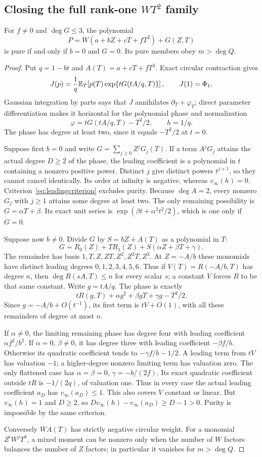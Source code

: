\subsection{Closing the full rank-one $WT^2$ family}\label{sec:rankoneformal}

\begin{proposition}\label{prop:rankoneformal}
For $f\ne0$ and $\deg G\leq3$, the polynomial
\[
 P=W(a+bZ+cT+fT^2)+G(Z,T)
\]
is pure if and only if $b=0$ and $G=0$. Its pure members obey
$m>\deg Q$.
\end{proposition}
\begin{proof}
Put $q=1-bt$ and $A(T)=a+cT+fT^2$. Exact circular contraction
gives
\[
 J(p)=\frac1q\mathbb E_T\!\left[p(T)
             \exp\{tG(tA/q,T)\}\right],\qquad J(1)=\Phi_1.
\]
Gaussian integration by parts says that $J$ annihilates
$\partial_T+\varphi_T$; direct parameter differentiation makes it
horizontal for the polynomial phase and normalization
\[
 \varphi=tG(tA/q,T)-T^2/2,\qquad h=1/q.
\]
The phase has degree at least two, since it equals $-T^2/2$ at $t=0$.

Suppose first $b=0$ and write $G=\sum_{j\geq0}Z^jG_j(T)$.
If a term $A^jG_j$ attains the actual degree $D\geq2$ of the phase,
the leading coefficient is a polynomial in $t$ containing a
nonzero positive power. Distinct $j$ give distinct powers $t^{j+1}$,
so they cannot cancel identically. Its order at infinity is negative,
whereas $v_\infty(h)=0$. Criterion~\eqref{eq:leadingcriterion}
excludes purity. Because $\deg A=2$, every nonzero $G_j$ with
$j\geq1$ attains some degree at least two. The only remaining
possibility is $G=\alpha T+\beta$. Its exact unit series is
$\exp(\beta t+\alpha^2t^2/2)$, which is one only if $G=0$.

Suppose now $b\ne0$. Divide $G$ by $S=bZ+A(T)$ as a polynomial
in $T$:
\[
 G=R_0(Z)+TR_1(Z)+S(\alpha Z+\beta T+\gamma).
\]
The remainder has basis $1,T,Z,ZT,Z^2,Z^2T,Z^3$. At $Z=-A/b$
these monomials have distinct leading degrees $0,1,2,3,4,5,6$.
Thus if $V(T)=R(-A/b,T)$ has degree $n$, then
$\deg R(sA,T)\leq n$ for every scalar $s$; a constant $V$
forces $R$ to be that same constant. Write $g=tA/q$. The phase is
exactly
\[
 tR(g,T)+\alpha g^2+\beta gT+\gamma g-T^2/2.
\]
Since $g=-A/b+O(t^{-1})$, its first term is $tV+O(1)$, with
all these remainders of degree at most $n$.

If $\alpha\ne0$, the limiting remaining phase has degree four
with leading coefficient $\alpha f^2/b^2$. If $\alpha=0$,
$\beta\ne0$, it has degree three with leading coefficient
$-\beta f/b$. Otherwise its quadratic coefficient tends to
$-\gamma f/b-1/2$. A leading term from $tV$ has valuation $-1$;
a higher-degree nonzero limiting term has valuation zero.
The only flattened case has
$\alpha=\beta=0$, $\gamma=-b/(2f)$. Its exact quadratic
coefficient outside $tR$ is $-1/(2q)$, of valuation one.
Thus in every case the actual leading coefficient $a_D$ has
$v_\infty(a_D)\leq1$. This also covers $V$ constant or linear.
But $v_\infty(h)=1$ and $D\geq2$, so
$Dv_\infty(h)-v_\infty(a_D)\geq D-1>0$.
Purity is impossible by the same criterion.

Conversely $W A(T)$ has strictly negative circular weight.
For a monomial $Z^iW^jT^k$, a mixed moment can be nonzero only
when the number of $W$ factors balances the number of $Z$ factors;
in particular it vanishes for $m>\deg Q$.
\end{proof}
